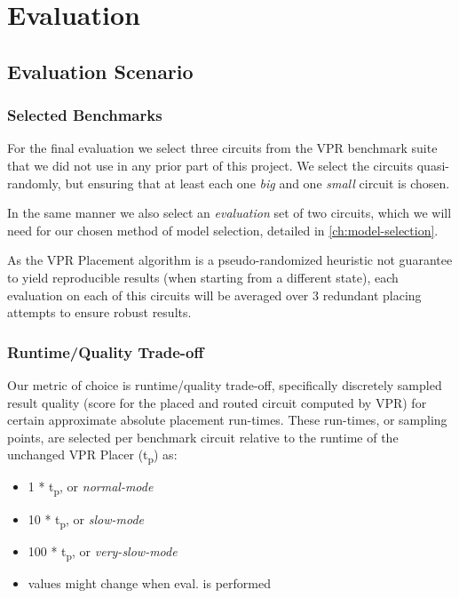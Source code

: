 
\chapter{Evaluation}\label{ch:evaluation}
\glsresetall %

\section{Evaluation Scenario}

\subsection{Selected Benchmarks}\label{ch:benchmarks}

For the final evaluation we select three circuits from the \gls{VPR} benchmark suite that we did not use in any prior part of this project. We select the circuits quasi-randomly, but ensuring that at least each one \textit{big} and one \textit{small} circuit is chosen.

In the same manner we also select an \textit{evaluation} set of two circuits, which we will need for our chosen method of model selection, detailed in \ref{ch:model-selection}.

As the \gls{VPR} Placement algorithm is a pseudo-randomized heuristic not guarantee to yield reproducible results (when starting from a different state), each evaluation on each of this circuits will be averaged over 3\cite{TODO} redundant placing attempts to ensure robust results.

\subsection{Runtime/Quality Trade-off}

Our metric of choice is runtime/quality trade-off, specifically discretely sampled result quality (score for the placed and routed circuit computed by \gls{VPR}) for certain approximate absolute placement run-times. These run-times, or sampling points, are selected per benchmark circuit relative to the runtime of the unchanged \gls{VPR} Placer (t\textsubscript{p}) as:

\begin{itemize}
	\item 1   * t\textsubscript{p}, or \textit{normal-mode}
	\item 10  * t\textsubscript{p}, or \textit{slow-mode}
	\item 100  * t\textsubscript{p}, or \textit{very-slow-mode}
	\item \cite{TODO} values might change when eval. is performed
\end{itemize}


